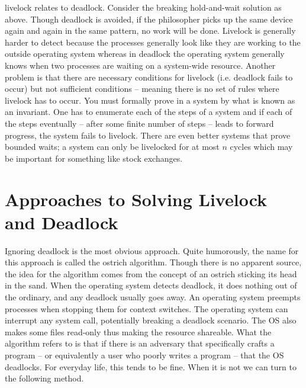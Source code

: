 \gls{livelock} relates to deadlock.
Consider the breaking hold-and-wait solution as above.
Though deadlock is avoided, if the philosopher picks up the same device again and again in the same pattern, no work will be done.
Livelock is generally harder to detect because the processes generally look like they are working to the outside operating system whereas in deadlock the operating system generally knows when two processes are waiting on a system-wide resource.
Another problem is that there are necessary conditions for livelock (i.e. deadlock fails to occur) but not sufficient conditions -- meaning there is no set of rules where livelock has to occur.
You must formally prove in a system by what is known as an invariant.
One has to enumerate each of the steps of a system and if each of the steps eventually -- after some finite number of steps -- leads to forward progress, the system fails to livelock.
There are even better systems that prove bounded waits; a system can only be livelocked for at most $n$ cycles which may be important for something like stock exchanges.

\section{Approaches to Solving Livelock and Deadlock}

Ignoring deadlock is the most obvious approach.
Quite humorously, the name for this approach is called the \gls{ostrich algorithm}.
Though there is no apparent source, the idea for the algorithm comes from the concept of an ostrich sticking its head in the sand.
When the operating system detects deadlock, it does nothing out of the ordinary, and any deadlock usually goes away.
An operating system preempts processes when stopping them for context switches.
The operating system can interrupt any system call, potentially breaking a deadlock scenario.
The OS also makes some files read-only thus making the resource shareable.
What the algorithm refers to is that if there is an adversary that specifically crafts a program -- or equivalently a user who poorly writes a program -- that the OS deadlocks.
For everyday life, this tends to be fine.
When it is not we can turn to the following method.

